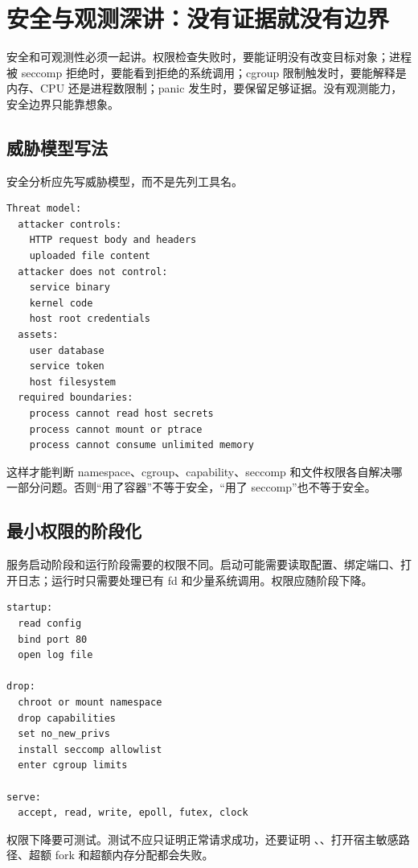 \section{安全与观测深讲：没有证据就没有边界}

安全和可观测性必须一起讲。权限检查失败时，要能证明没有改变目标对象；进程被 seccomp 拒绝时，要能看到拒绝的系统调用；cgroup 限制触发时，要能解释是内存、CPU 还是进程数限制；panic 发生时，要保留足够证据。没有观测能力，安全边界只能靠想象。

\subsection{威胁模型写法}

安全分析应先写威胁模型，而不是先列工具名。

\begin{lstlisting}
Threat model:
  attacker controls:
    HTTP request body and headers
    uploaded file content
  attacker does not control:
    service binary
    kernel code
    host root credentials
  assets:
    user database
    service token
    host filesystem
  required boundaries:
    process cannot read host secrets
    process cannot mount or ptrace
    process cannot consume unlimited memory
\end{lstlisting}

这样才能判断 namespace、cgroup、capability、seccomp 和文件权限各自解决哪一部分问题。否则“用了容器”不等于安全，“用了 seccomp”也不等于安全。

\subsection{最小权限的阶段化}

服务启动阶段和运行阶段需要的权限不同。启动可能需要读取配置、绑定端口、打开日志；运行时只需要处理已有 fd 和少量系统调用。权限应随阶段下降。

\begin{lstlisting}
startup:
  read config
  bind port 80
  open log file

drop:
  chroot or mount namespace
  drop capabilities
  set no_new_privs
  install seccomp allowlist
  enter cgroup limits

serve:
  accept, read, write, epoll, futex, clock
\end{lstlisting}

权限下降要可测试。测试不应只证明正常请求成功，还要证明 、、打开宿主敏感路径、超额 fork 和超额内存分配都会失败。

